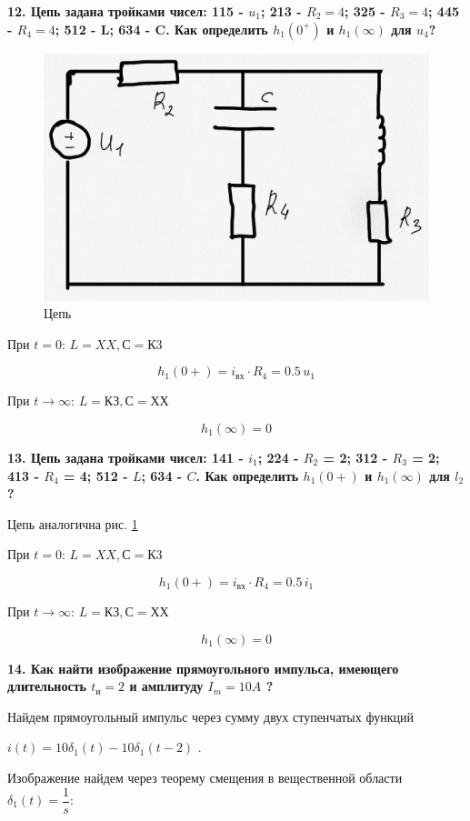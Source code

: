 \textbf{
    12. Цепь задана тройками чисел: 
    115 - $ u_1 $; 
    213 - $ R_2 = 4 $; 
    325 - $ R_3 = 4 $; 
    445 - $ R_4 = 4 $; 
    512 - L; 
    634 - C. 
    Как определить 
    $ h_{1}(0^+) $ и $ h_{1}(\infty) $ для $ u_4 $?
}

\begin{figure}[H]
    \centering
    \includegraphics[width=0.7\linewidth]{photo/q12}
    \caption{Цепь}
    \label{fig:q12}
\end{figure}

При $ t = 0 $: $ L = XX, С = К3 $ 

$$ h_{1}(0+) = i_{вх} \cdot R_{4} = 0.5 \, u_1 $$

При $ t \rightarrow \infty$: $ L = КЗ, С = ХХ $  
 
$$ h_{1}(\infty) = 0 $$

\textbf{
    13. Цепь задана тройками чисел: 
    141 - $ i_{1} $; 
    224 - $ R_2 $ = 2; 
    312 - $ R_3 $ = 2; 
    413 - $ R_4 $ = 4; 
    512 - $ L $; 
    634 - $ C $. 
    Как определить 
    $ h_{1}(0+) $ и $ h_{1}(\infty) $ 
    для $ l_{2} $?
}

Цепь аналогична рис. \ref{fig:q12}

При $ t = 0 $: $ L = XX, С = К3 $ 

$$ h_{1}(0+) = i_{вх} \cdot R_{4} = 0.5 \, i_1 $$

При $ t \rightarrow \infty$: $ L = КЗ, С = ХХ $  

$$ h_{1}(\infty) = 0 $$

\textbf{
    14. Как найти изображение 
    прямоугольного импульса, 
    имеющего длительность $ t_{и} = 2 $ 
    и амплитуду $ I_{m} = 10 A $ ?
}

Найдем прямоугольный импульс 
через сумму двух ступенчатых функций 

$ i(t) = 10\delta_{1}(t) - 10\delta_{1}(t-2)$ . 

Изображение найдем через теорему смещения в вещественной области $ \delta_{1}(t) = \dfrac{1}{s} $:\\

